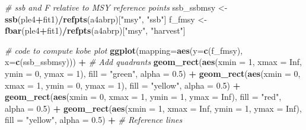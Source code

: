 \documentclass[
]{book}
\newenvironment{Shaded}{\begin{snugshade}}{\end{snugshade}}
\newcommand{\AttributeTok}[1]{\textcolor[rgb]{0.13,0.29,0.53}{#1}}
\newcommand{\CommentTok}[1]{\textcolor[rgb]{0.56,0.35,0.01}{\textit{#1}}}
\newcommand{\ConstantTok}[1]{\textcolor[rgb]{0.56,0.35,0.01}{#1}}
\newcommand{\DecValTok}[1]{\textcolor[rgb]{0.00,0.00,0.81}{#1}}
\newcommand{\FloatTok}[1]{\textcolor[rgb]{0.00,0.00,0.81}{#1}}
\newcommand{\FunctionTok}[1]{\textcolor[rgb]{0.13,0.29,0.53}{\textbf{#1}}}
\newcommand{\NormalTok}[1]{#1}
\newcommand{\OtherTok}[1]{\textcolor[rgb]{0.56,0.35,0.01}{#1}}
\newcommand{\SpecialCharTok}[1]{\textcolor[rgb]{0.81,0.36,0.00}{\textbf{#1}}}
\newcommand{\StringTok}[1]{\textcolor[rgb]{0.31,0.60,0.02}{#1}}
\begin{document}
\begin{Shaded}
\begin{Highlighting}[]
\CommentTok{\# ssb and F relative to MSY reference points}
\NormalTok{ssb\_ssbmsy }\OtherTok{\textless{}{-}} \FunctionTok{ssb}\NormalTok{(ple4}\SpecialCharTok{+}\NormalTok{fit1)}\SpecialCharTok{/}\FunctionTok{refpts}\NormalTok{(a4abrp)[}\StringTok{"msy"}\NormalTok{, }\StringTok{"ssb"}\NormalTok{]}
\NormalTok{f\_fmsy }\OtherTok{\textless{}{-}} \FunctionTok{fbar}\NormalTok{(ple4}\SpecialCharTok{+}\NormalTok{fit1)}\SpecialCharTok{/}\FunctionTok{refpts}\NormalTok{(a4abrp)[}\StringTok{"msy"}\NormalTok{, }\StringTok{"harvest"}\NormalTok{]}

\CommentTok{\# code to compute kobe plot}
\FunctionTok{ggplot}\NormalTok{(}\AttributeTok{mapping=}\FunctionTok{aes}\NormalTok{(}\AttributeTok{y=}\FunctionTok{c}\NormalTok{(f\_fmsy), }\AttributeTok{x=}\FunctionTok{c}\NormalTok{(ssb\_ssbmsy))) }\SpecialCharTok{+}
  \CommentTok{\# Add quadrants}
  \FunctionTok{geom\_rect}\NormalTok{(}\FunctionTok{aes}\NormalTok{(}\AttributeTok{xmin =} \DecValTok{1}\NormalTok{, }\AttributeTok{xmax =} \ConstantTok{Inf}\NormalTok{, }\AttributeTok{ymin =} \DecValTok{0}\NormalTok{, }\AttributeTok{ymax =} \DecValTok{1}\NormalTok{), }\AttributeTok{fill =} \StringTok{"green"}\NormalTok{, }\AttributeTok{alpha =} \FloatTok{0.5}\NormalTok{) }\SpecialCharTok{+}
  \FunctionTok{geom\_rect}\NormalTok{(}\FunctionTok{aes}\NormalTok{(}\AttributeTok{xmin =} \DecValTok{0}\NormalTok{, }\AttributeTok{xmax =} \DecValTok{1}\NormalTok{, }\AttributeTok{ymin =} \DecValTok{0}\NormalTok{, }\AttributeTok{ymax =} \DecValTok{1}\NormalTok{), }\AttributeTok{fill =} \StringTok{"yellow"}\NormalTok{, }\AttributeTok{alpha =} \FloatTok{0.5}\NormalTok{) }\SpecialCharTok{+}
  \FunctionTok{geom\_rect}\NormalTok{(}\FunctionTok{aes}\NormalTok{(}\AttributeTok{xmin =} \DecValTok{0}\NormalTok{, }\AttributeTok{xmax =} \DecValTok{1}\NormalTok{, }\AttributeTok{ymin =} \DecValTok{1}\NormalTok{, }\AttributeTok{ymax =} \ConstantTok{Inf}\NormalTok{), }\AttributeTok{fill =} \StringTok{"red"}\NormalTok{, }\AttributeTok{alpha =} \FloatTok{0.5}\NormalTok{) }\SpecialCharTok{+}
  \FunctionTok{geom\_rect}\NormalTok{(}\FunctionTok{aes}\NormalTok{(}\AttributeTok{xmin =} \DecValTok{1}\NormalTok{, }\AttributeTok{xmax =} \ConstantTok{Inf}\NormalTok{, }\AttributeTok{ymin =} \DecValTok{1}\NormalTok{, }\AttributeTok{ymax =} \ConstantTok{Inf}\NormalTok{), }\AttributeTok{fill =} \StringTok{"yellow"}\NormalTok{, }\AttributeTok{alpha =} \FloatTok{0.5}\NormalTok{) }\SpecialCharTok{+}
  \CommentTok{\# Reference lines}

\end{Highlighting}
\end{Shaded}
\end{document}
